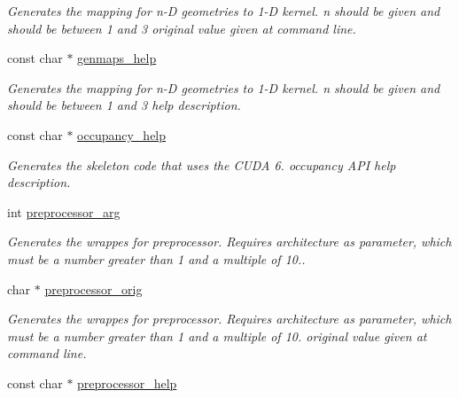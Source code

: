 \begin{DoxyCompactItemize}
\begin{DoxyCompactList}\small\item\em Generates the mapping for n-\/\-D geometries to 1-\/\-D kernel. n should be given and should be between 1 and 3 original value given at command line. \end{DoxyCompactList}\item 
\hypertarget{structgengetopt__args__info_a542aeae8cb10abde41aa014d87092e91}{const char $\ast$ \hyperlink{structgengetopt__args__info_a542aeae8cb10abde41aa014d87092e91}{genmaps\-\_\-help}}\label{structgengetopt__args__info_a542aeae8cb10abde41aa014d87092e91}

\begin{DoxyCompactList}\small\item\em Generates the mapping for n-\/\-D geometries to 1-\/\-D kernel. n should be given and should be between 1 and 3 help description. \end{DoxyCompactList}\item 
\hypertarget{structgengetopt__args__info_ad1c626f261bb1fb2f5c0c4249c9db703}{const char $\ast$ \hyperlink{structgengetopt__args__info_ad1c626f261bb1fb2f5c0c4249c9db703}{occupancy\-\_\-help}}\label{structgengetopt__args__info_ad1c626f261bb1fb2f5c0c4249c9db703}

\begin{DoxyCompactList}\small\item\em Generates the skeleton code that uses the C\-U\-D\-A 6. occupancy A\-P\-I help description. \end{DoxyCompactList}\item 
\hypertarget{structgengetopt__args__info_a00fa76fff59986742ee18e84481e05e7}{int \hyperlink{structgengetopt__args__info_a00fa76fff59986742ee18e84481e05e7}{preprocessor\-\_\-arg}}\label{structgengetopt__args__info_a00fa76fff59986742ee18e84481e05e7}

\begin{DoxyCompactList}\small\item\em Generates the wrappes for preprocessor. Requires architecture as parameter, which must be a number greater than 1 and a multiple of 10.. \end{DoxyCompactList}\item 
\hypertarget{structgengetopt__args__info_a3171d6bbcf1bdee70af732e4cbd341a0}{char $\ast$ \hyperlink{structgengetopt__args__info_a3171d6bbcf1bdee70af732e4cbd341a0}{preprocessor\-\_\-orig}}\label{structgengetopt__args__info_a3171d6bbcf1bdee70af732e4cbd341a0}

\begin{DoxyCompactList}\small\item\em Generates the wrappes for preprocessor. Requires architecture as parameter, which must be a number greater than 1 and a multiple of 10. original value given at command line. \end{DoxyCompactList}\item 
\hypertarget{structgengetopt__args__info_a966b50978e3dd62a9977a831e75590e6}{const char $\ast$ \hyperlink{structgengetopt__args__info_a966b50978e3dd62a9977a831e75590e6}{preprocessor\-\_\-help}}\label{structgengetopt__args__info_a966b50978e3dd62a9977a831e75590e6}


\end{DoxyCompactItemize}
